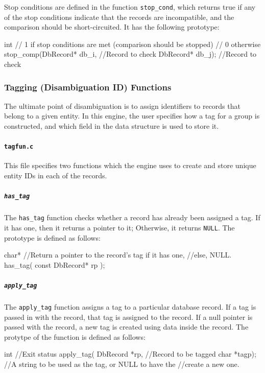 \documentclass[10pt, letterpaper]{article}
\begin{document}
Stop conditions are defined in the function {\texttt{stop\_cond}}, which returns true if any of the stop
conditions indicate that the records are incompatible, and the comparison should be short-circuited. It
has the following prototype:
\begin{verbatimtab}
int                         // 1 if stop conditions are met (comparison should be stopped)
                            // 0 otherwise
stop_comp(DbRecord* db_i,   //Record to check 
          DbRecord* db_j);  //Record to check
\end{verbatimtab}

\subsubsection{Tagging (Disambiguation ID) Functions}
The ultimate point of disambiguation is to assign identifiers to records that belong to a given entity.
In this engine, the user specifies how a tag for a group is constructed, and which field in the data structure is used to store it.
\paragraph{\texttt{tagfun.c}}
This file specifies two functions which the engine uses to create and store unique entity IDs in each of the records.
\subparagraph{\texttt{has\_tag}}
The \texttt{has\_tag} function checks whether a record has already been assigned a tag. If it has one, then it returns a pointer to it;
Otherwise, it returns \texttt{NULL}. The prototype is defined as follows:
\begin{verbatimtab}
char*                           //Return a pointer to the record's tag if it has one,
                                //else, NULL.
has_tag( const DbRecord* rp );
\end{verbatimtab}
\subparagraph{\texttt{apply\_tag}}
The \texttt{apply\_tag} function assigns a tag to a particular database record. If a tag is passed in with
the record, that tag is assigned to the record. If a null pointer is passed with the record, a new tag is
created using data inside the record. The protytpe of the function is defined as follows:
\begin{verbatimtab}
int                         //Exit status
apply_tag( DbRecord *rp,    //Record to be tagged
           char *tagp);     //A string to be used as the tag, or NULL to have the
                            //create a new one.
\end{verbatimtab}
\end{document}
